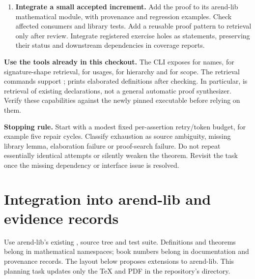 \documentclass[11pt,a4paper]{article}
\newcommand{\code}[1]{\texttt{\detokenize{#1}}}
\begin{document}
\begin{enumerate}
  typecheck with secondary checking. A fully verified result has no holes in
  its dependency closure. Report intentional exercise goals and their consumers
  separately; reject unregistered gaps, forbidden axioms and hidden classical
  strength in hypotheses. A parameterized classical principle is still outside
  the constructive target.
  \item \textbf{Integrate a small accepted increment.} Add the proof to its
  arend-lib mathematical module, with provenance and regression examples.
  Check affected consumers and library tests. Add a reusable proof pattern to
  retrieval only after review. Integrate registered exercise holes as statements,
  preserving their status and downstream dependencies in coverage reports.
\end{enumerate}

\textbf{Use the tools already in this checkout.} The CLI exposes
\code{-ss} for names, \code{-ps} for signature-shape retrieval,
\code{-fu} for usages, \code{-ch} for hierarchy and \code{-sc} for scope.
The retrieval commands support \code{--json}; \code{-p} prints elaborated
definitions after checking. In particular, \code{-ps} is retrieval of existing
declarations, not a general automatic proof synthesizer. Verify these
capabilities against the newly pinned executable before relying on them.

\textbf{Stopping rule.} Start with a modest fixed per-assertion retry/token
budget, for example five repair cycles. Classify exhaustion as source
ambiguity, missing library lemma, elaboration failure or proof-search failure.
Do not repeat essentially identical attempts or silently weaken the theorem.
Revisit the task once the missing dependency or interface issue is resolved.

\newpage
\section{Integration into arend-lib and evidence records}
Use arend-lib's existing \code{arend.yaml}, source tree and test suite.
Definitions and theorems belong in mathematical namespaces; book numbers
belong in documentation and provenance records. The layout below proposes
extensions to arend-lib. This planning task updates only the TeX and PDF in
the repository's \code{docs/} directory.
\end{document}
